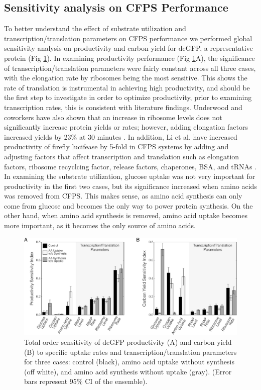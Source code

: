 \documentclass[journal=asbcd6,manuscript=article]{achemso}
\begin{document}
\subsection{Sensitivity analysis on CFPS Performance}
To better understand the effect of substrate utilization and transcription/translation parameters on CFPS performance we performed global sensitivity analysis on productivity and carbon yield for deGFP, a representative protein (Fig \ref{fig:SI_GFP}).
In examining productivity performance (Fig \ref{fig:SI_GFP}A), the significance of transcription/translation parameters were fairly constant across all three cases, with the elongation rate by ribosomes being the most sensitive.
This shows the rate of translation is instrumental in achieving high productivity, and should be the first step to investigate in order to optimize productivity, prior to examining transcription rates, this is consistent with literature findings.
Underwood and coworkers have also shown that an increase in ribosome levels does not significantly increase protein yields or rates; however, adding elongation factors increased yields by 23\% at 30 minutes \cite{2005_underwood_biotech}.
In addition, Li et al. have increased productivity of firefly lucifease by 5-fold in CFPS systems by adding and adjusting factors that affect transcription and translation such as elongation factors, ribosome recyclcing factor, release factors, chaperones, BSA, and tRNAs \cite{2014_li_PlosOne}.
In examining the substrate utilization, glucose uptake was not very important for productivity in the first two cases, but its significance increased when amino acids was removed from CFPS.
This makes sense, as amino acid synthesis can only come from glucose and becomes the only way to power protein synthesis.
On the other hand, when amino acid synthesis is removed, amino acid uptake becomes more important, as it becomes the only source of amino acids.
\begin{figure}[t!]
\includegraphics[width=1.00\textwidth]{./Figures/SI_GFP.pdf}
\caption{Total order sensitivity of deGFP productivity (A) and carbon yield (B) to specific uptake rates and transcription/translation parameters for three cases: control (black), amino acid uptake without synthesis (off white), and amino acid synthesis without uptake (gray). (Error bars represent 95\% CI of the ensemble).}
\label{fig:SI_GFP}
\end{figure}
\end{document}
